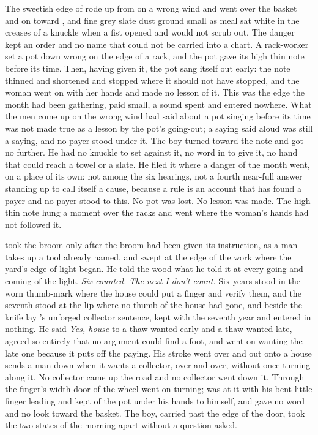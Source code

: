 The sweetish edge of  rode up from  on a wrong wind and went over the basket and on toward , and fine grey slate dust ground small as meal sat white in the creases of a knuckle when a fist opened and would not scrub out. The danger kept an order and no name that could not be carried into a chart. A rack-worker set a pot down wrong on the edge of a rack, and the pot gave its high thin note before its time. Then, having given it, the pot sang itself out early: the note thinned and shortened and stopped where it should not have stopped, and the woman went on with her hands and made no lesson of it. This was the edge the month had been gathering, paid small, a sound spent and entered nowhere. What the men come up on the wrong wind had said about a pot singing before its time was not made true as a lesson by the pot's going-out; a saying said aloud was still a saying, and no payer stood under it. The boy turned toward the note and got no further. He had no knuckle to set against it, no word in  to give it, no hand that could reach a towel or a slate. He filed it where a danger of the month went, on a place of its own: not among the six hearings, not a fourth near-full answer standing up to call itself a cause, because a rule is an account that has found a payer and no payer stood to this. No pot was lost. No lesson was made. The high thin note hung a moment over the racks and went where the woman's hands had not followed it.

 took the broom only after the broom had been given its instruction, as a man takes up a tool already named, and swept at the edge of the work where the yard's edge of light began. He told the wood what he told it at every going and coming of the light. \emph{Six counted. The next I don't count.} Six years stood in the worn thumb-mark where the house could put a finger and verify them, and the seventh stood at the lip where no thumb of the house had gone, and beside the knife lay 's unforged collector sentence, kept with the seventh year and entered in nothing. He said \emph{Yes, house} to a thaw wanted early and a thaw wanted late, agreed so entirely that no argument could find a foot, and went on wanting the late one because it puts off the paying. His stroke went over  and out onto  a house sends a man down when it wants a collector, over and over, without once turning along it. No collector came up the road and no collector went down it. Through the finger's-width door of  the wheel went on turning;  was at it with his bent little finger leading and kept  of the pot under his hands to himself, and gave no word and no look toward the basket. The boy, carried past the edge of the door, took the two states of the morning apart without a question asked.


